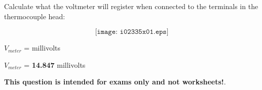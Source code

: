 

Calculate what the voltmeter will register when connected to the terminals in the thermocouple head:

$$\texttt{[image: i02335x01.eps]}$$

$V_{meter}$ = \underbar{\hskip 50pt} millivolts







$V_{meter}$ = {\bf 14.847} millivolts







{\bf This question is intended for exams only and not worksheets!}.


